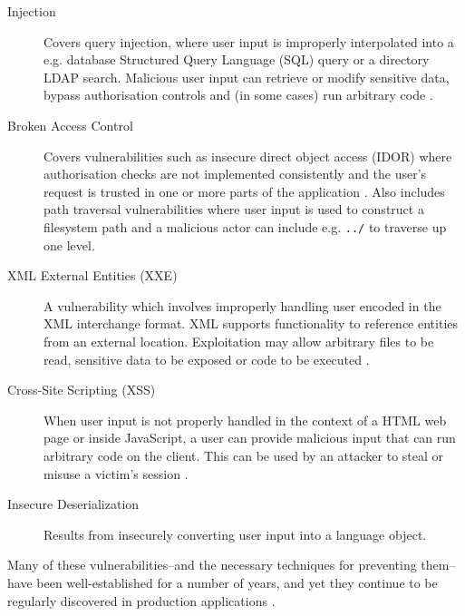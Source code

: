 \documentclass[a4paper,openany,12pt]{book}
\begin{document}
\begin{description}
    \item[Injection] Covers query injection, where user input is improperly interpolated into a e.g. database Structured
                     Query Language (SQL) query or a directory LDAP search. Malicious user input can retrieve or modify
                     sensitive data, bypass authorisation controls and (in some cases) run arbitrary code \citep[p.~291]{stuttard2011web}.
    \item[Broken Access Control] Covers vulnerabilities such as insecure direct object access (IDOR) where authorisation
                                 checks are not implemented consistently and the user's request is trusted in one or
                                 more parts of the application \citep[p.~257]{stuttard2011web}. Also includes path
                                 traversal vulnerabilities where user input is used to construct a filesystem path and a
                                 malicious actor can include e.g. \texttt{../} to traverse up one level.
    \item[XML External Entities (XXE)] A vulnerability which involves improperly handling user encoded in the XML
                                       interchange format. XML supports functionality to reference entities from an
                                       external location. Exploitation may allow arbitrary files to be read, sensitive
                                       data to be exposed or code to be executed  \citep[p.~384]{stuttard2011web}.
    \item[Cross-Site Scripting (XSS)] When user input is not properly handled in the context of a HTML web page or
                                      inside JavaScript, a user can provide malicious input that can run arbitrary code
                                      on the client. This can be used by an attacker to steal or misuse a victim's
                                      session \citep[p.~431]{stuttard2011web}.
    \item[Insecure Deserialization] Results from insecurely converting user input into a language object.
\end{description}

Many of these vulnerabilities--and the necessary techniques for preventing them--have been well-established for a
number of years, and yet they continue to be regularly discovered in production applications \citep[p.~2]{schneier2011secrets}.
\end{document}
